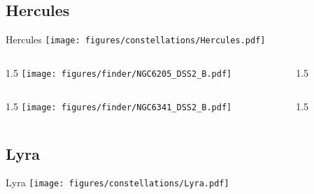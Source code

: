 \documentclass[final]{beamer}
\newlength{\colwidth}
\begin{document}
\subsection{Hercules}

\begin{frame}[t]{\LARGE Hercules}
  \centering
  \texttt{[image: figures/constellations/Hercules.pdf]}
\end{frame}


\begin{frame}[t]{}
  \begin{columns}[T]
    \begin{column}{1.5\colwidth}
      \centering
      \texttt{[image: figures/finder/NGC6205\_DSS2\_B.pdf]}
    \end{column}
    \begin{column}{1.5\colwidth}
      \Large
      
    \end{column}
  \end{columns}
  \vspace{\fill}
  \begin{columns}[T]
    \begin{column}{1.5\colwidth}
      \centering
      \texttt{[image: figures/finder/NGC6341\_DSS2\_B.pdf]}
    \end{column}
    \begin{column}{1.5\colwidth}
      \Large
      
    \end{column}
  \end{columns}
\end{frame}

\subsection{Lyra}

\begin{frame}[t]{\LARGE Lyra}
  \centering
  \texttt{[image: figures/constellations/Lyra.pdf]}
\end{frame}

\end{document}
